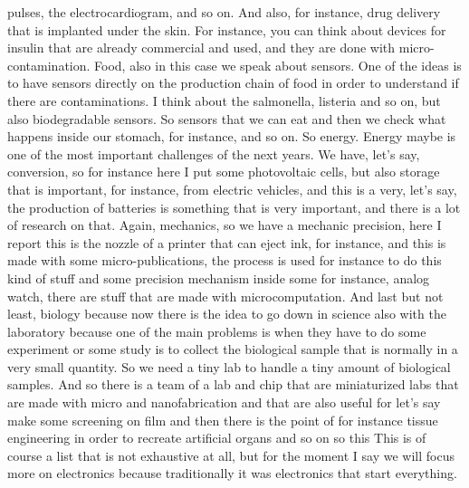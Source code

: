 pulses, the electrocardiogram, and so on. And also, for instance, drug delivery that is implanted under the skin. For instance, you can think about devices for insulin that are already commercial and used, and they are done with micro-contamination. Food, also in this case we speak about sensors. One of the ideas is to have sensors directly on the production chain of food in order to understand if there are contaminations. I think about the salmonella, listeria and so on, but also biodegradable sensors. So sensors that we can eat and then we check what happens inside our stomach, for instance, and so on. So energy. Energy maybe is one of the most important challenges of the next years. We have, let's say, conversion, so for instance here I put some photovoltaic cells, but also storage that is important, for instance, from electric vehicles, and this is a very, let's say, the production of batteries is something that is very important, and there is a lot of research on that. Again, mechanics, so we have a mechanic precision, here I report this is the nozzle of a printer that can eject ink, for instance, and this is made with some micro-publications, the process is used for instance to do this kind of stuff and some precision mechanism inside some for instance, analog watch, there are stuff that are made with microcomputation. And last but not least, biology because now there is the idea to go down in science also with the laboratory because one of the main problems is when they have to do some experiment or some study is to collect the biological sample that is normally in a very small quantity. So we need a tiny lab to handle a tiny amount of biological samples. And so there is a team of a lab and chip that are miniaturized labs that are made with micro and nanofabrication and that are also useful for let's say make some screening on film and then there is the point of for instance tissue engineering in order to recreate artificial organs and so on so this This is of course a list that is not exhaustive at all, but for the moment I say we will focus more on electronics because traditionally it was electronics that start everything.

